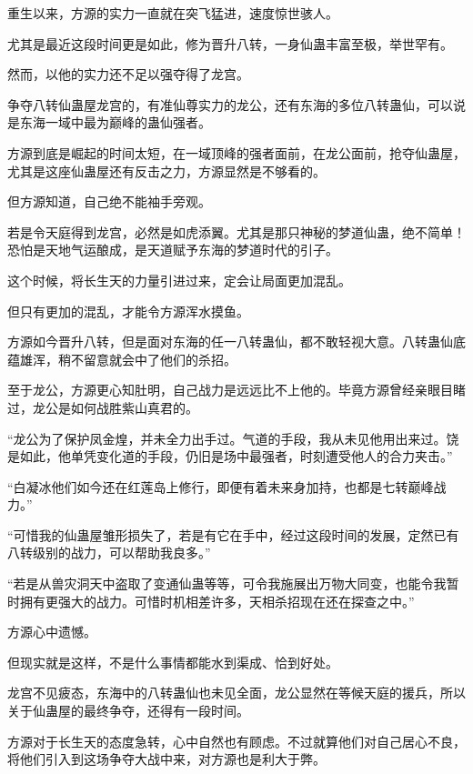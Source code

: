 
\begin{this_body}



重生以来，方源的实力一直就在突飞猛进，速度惊世骇人。

尤其是最近这段时间更是如此，修为晋升八转，一身仙蛊丰富至极，举世罕有。

然而，以他的实力还不足以强夺得了龙宫。

争夺八转仙蛊屋龙宫的，有准仙尊实力的龙公，还有东海的多位八转蛊仙，可以说是东海一域中最为巅峰的蛊仙强者。

方源到底是崛起的时间太短，在一域顶峰的强者面前，在龙公面前，抢夺仙蛊屋，尤其是这座仙蛊屋还有反击之力，方源显然是不够看的。

但方源知道，自己绝不能袖手旁观。

若是令天庭得到龙宫，必然是如虎添翼。尤其是那只神秘的梦道仙蛊，绝不简单！恐怕是天地气运酿成，是天道赋予东海的梦道时代的引子。

这个时候，将长生天的力量引进过来，定会让局面更加混乱。

但只有更加的混乱，才能令方源浑水摸鱼。

方源如今晋升八转，但是面对东海的任一八转蛊仙，都不敢轻视大意。八转蛊仙底蕴雄浑，稍不留意就会中了他们的杀招。

至于龙公，方源更心知肚明，自己战力是远远比不上他的。毕竟方源曾经亲眼目睹过，龙公是如何战胜紫山真君的。

“龙公为了保护凤金煌，并未全力出手过。气道的手段，我从未见他用出来过。饶是如此，他单凭变化道的手段，仍旧是场中最强者，时刻遭受他人的合力夹击。”

“白凝冰他们如今还在红莲岛上修行，即便有着未来身加持，也都是七转巅峰战力。”

“可惜我的仙蛊屋雏形损失了，若是有它在手中，经过这段时间的发展，定然已有八转级别的战力，可以帮助我良多。”

“若是从兽灾洞天中盗取了变通仙蛊等等，可令我施展出万物大同变，也能令我暂时拥有更强大的战力。可惜时机相差许多，天相杀招现在还在探查之中。”

方源心中遗憾。

但现实就是这样，不是什么事情都能水到渠成、恰到好处。

龙宫不见疲态，东海中的八转蛊仙也未见全面，龙公显然在等候天庭的援兵，所以关于仙蛊屋的最终争夺，还得有一段时间。

方源对于长生天的态度急转，心中自然也有顾虑。不过就算他们对自己居心不良，将他们引入到这场争夺大战中来，对方源也是利大于弊。


\end{this_body}
